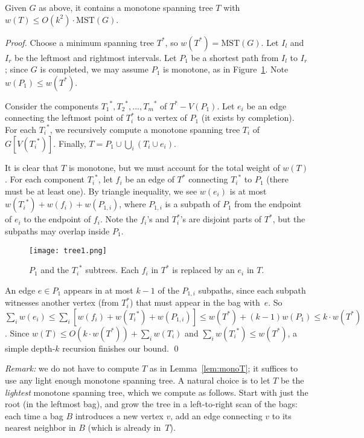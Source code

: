 \documentclass{llncs}
\def\MST{\mbox{MST}}\def\OPT{\mbox{OPT}}\def\Left{\mbox{left}}\def\In#1{\mbox{in$(#1)$}} \def\Out#1{\mbox{out$(#1)$}} \def\Net#1{\mbox{net$(#1)$}} \def\xeP{x_{(e,P)}}
\begin{document}
\begin{lemma}\label{lem:monoT} Given $G$ as above, it contains a monotone
 spanning tree $T$ with $w(T)\leq O(k^2)\cdot \MST(G)$. 
\end{lemma}
\begin{proof}
Choose a minimum spanning tree $T^*$, so $w(T^*)=\MST(G)$.
Let $I_l$ and $I_r$ be the leftmost and rightmost intervals.
Let $P_1$ be a shortest path from $I_l$ to $I_r$; since $G$ is completed,
we may assume $P_1$ is monotone, as in Figure~\ref{fig:tree1}.
Note $w(P_1)\leq w(T^*)$.

Consider the components ${T_1}^*, {T_2}^*, ..., {T_m}^*$ of $T^* - V(P_1)$.
Let $e_i$ be an edge connecting the leftmost point of $T_i^\ast$ to a
vertex of $P_1$ (it exists by completion).
For each ${T_i}^*$, we recursively compute a monotone spanning tree $T_i$
of $G[V({T_i}^*)]$. Finally, $T = P_1 \cup \bigcup_i (T_i\cup e_i)$.

It is clear that $T$ is monotone, but we must account for the total
weight of $w(T)$.  For each component ${T_i}^*$, let $f_i$ be an edge
of $T^*$ connecting ${T_i}^*$ to $P_1$ (there must be at least one).
By triangle inequality, we see $w(e_i)$ is at most $w({T_i}^*) +
w(f_i) + w(P_{1,i})$, where $P_{1,i}$ is a subpath of $P_1$ from
the endpoint of $e_i$ to the endpoint of $f_i$.  Note the $f_i$'s and
$T^*_i$'s are disjoint parts of $T^*$, but the subpaths may overlap inside
$P_1$.

\begin{figure}[ht]
\begin{center}
{\texttt{[image: tree1.png]}}
\caption{$P_1$ and the ${T_i}^*$ subtrees. Each 
$f_i$ in $T^*$ is replaced by an $e_i$ in $T$.}
\label{fig:tree1}
\end{center}
\end{figure}

An edge $e\in P_1$ appears in at most $k-1$ of the
$P_{1,i}$ subpaths, since each subpath witnesses another vertex (from
$T^*_i$) that must appear in the bag with~$e$.  So $\sum_i
w(e_i)\leq\sum_i [w(f_i)+w({T_i}^*)+w(P_{1,i})]\leq
w(T^*)+(k-1)w(P_1)\leq k\cdot w(T^*)$.  Since $w(T) \leq O(k\cdot
w(T^*)) + \sum_i w(T_i)$ and $\sum_i w({T_i}^*) \leq w(T^*)$, a simple
depth-$k$ recursion finishes our bound.  \qed
\end{proof}

\noindent\emph{Remark:} we do not have to compute $T$ as in
Lemma~\ref{lem:monoT}; it suffices to use any light enough monotone
spanning tree.  A natural choice is to let $T$ be the \emph{lightest}
monotone spanning tree, which we compute as follows.  Start with just
the root (in the leftmost bag), and grow the tree in a left-to-right
scan of the bags: each time a bag $B$ introduces a new vertex $v$, add
an edge connecting $v$ to its nearest neighbor in $B$ (which is
already in~$T$).
\end{document}
